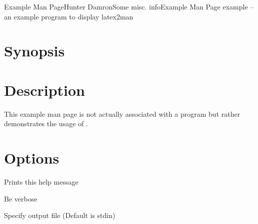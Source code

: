 \documentclass[10pt,letterpaper]{article}
\begin{document}
  \begin{Name}{7}{Example Man Page}{Hunter Damron}{Some misc. info}{Example Man Page}
    example -- an example program to display latex2man
  \end{Name}

  \section{Synopsis}
       

  \section{Description}
    This example man page is not actually associated with a program but rather demonstrates the usage of .

  \section{Options}
  \begin{Description}
    \item[\Opt{-h, --help}] Prints this help message
    \item[\Opt{-v, --verbose}] Be verbose
    \item[\OptArg{-o, --output=}{filename}] Specify output file (Default is stdin)
  \end{Description}
\end{document}
